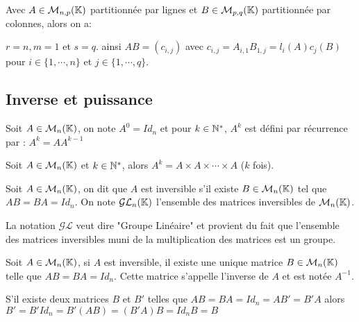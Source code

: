 \documentclass[a4paper, 12pt]{article}
\begin{document}
\begin{remark}
    Avec $A \in \mathcal{M}_{n,p}(\mathbb{K})$ partitionnée par lignes et $B \in \mathcal{M}_{p,q}(\mathbb{K})$ partitionnée par colonnes, alors on a:

    $r = n, m = 1$ et $s = q$.
    ainsi $AB = (c_{i,j})$ avec $c_{i,j} = A_{i,1}B_{1,j} = l_i(A)c_j(B)$ pour $i \in \{1, \cdots, n\}$ et $j \in \{1, \cdots, q\}$.
\end{remark}

\subsection{Inverse et puissance}

\begin{definition}
    Soit $A \in \mathcal{M}_n(\mathbb{K})$, on note $A^0 = Id_n$ et pour $k \in \mathbb{N}^*$, $A^k$ est défini par récurrence par : $A^k = AA^{k-1}$
\end{definition}

\begin{proprietes}
    Soit $A \in \mathcal{M}_n(\mathbb{K})$ et $k \in \mathbb{N}^*$, alors $A^k = A \times A \times \cdots \times A$ ($k$ fois).
\end{proprietes}

\begin{definition}
    Soit $A \in \mathcal{M}_n(\mathbb{K})$, on dit que $A$ est inversible s'il existe $B \in \mathcal{M}_n(\mathbb{K})$ tel que $AB = BA = Id_n$.
    On note $\mathcal{GL}_n(\mathbb{K})$ l'ensemble des matrices inversibles de $\mathcal{M}_n(\mathbb{K})$.
\end{definition}

\begin{remark}
    La notation $\mathcal{GL}$ veut dire "Groupe Linéaire" et provient du fait que l'ensemble des matrices inversibles muni de la multiplication des matrices est un groupe.
\end{remark}

\begin{proposition}
    Soit $A \in \mathcal{M}_n(\mathbb{K})$, si $A$ est inversible, il existe une unique matrice $B \in \mathcal{M}_n(\mathbb{K})$ telle que $AB = BA = Id_n$.
    Cette matrice s'appelle l'inverse de $A$ et est notée $A^{-1}$.
\end{proposition}

\begin{demonstration}
    S'il existe deux matrices $B$ et $B'$ telles que $AB = BA = Id_n = AB' = B'A$ alors $B' = B'Id_n = B'(AB) = (B'A)B = Id_nB = B$
\end{demonstration}
\end{document}

